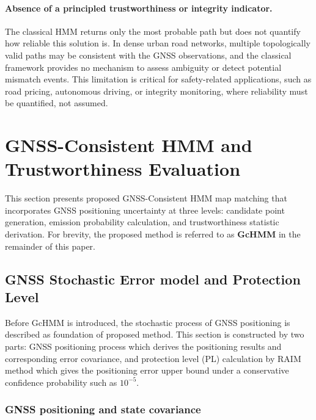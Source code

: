 \documentclass[letterpaper,journal]{IEEEtran}
\begin{document}
\paragraph{Absence of a principled trustworthiness or integrity indicator.}
The classical HMM returns only the most probable path but does not quantify
how reliable this solution is. In dense urban road networks, multiple
topologically valid paths may be consistent with the GNSS observations, and
the classical framework provides no mechanism to assess ambiguity or detect
potential mismatch events. This limitation is critical for safety-related
applications, such as road pricing, autonomous driving, or integrity
monitoring, where reliability must be quantified, not assumed.


\section{GNSS-Consistent HMM and Trustworthiness Evaluation}
\label{sec:proposed}
This section presents proposed GNSS-Consistent HMM map matching that incorporates GNSS positioning 
uncertainty at three levels: candidate point generation, emission probability calculation, and 
trustworthiness statistic derivation. For brevity, the proposed method is referred to as \textbf{GcHMM} in the remainder of this paper.

\subsection{GNSS Stochastic Error model and Protection Level}
\label{subsec:gnss_stochastic}
Before GcHMM is introduced, the stochastic process of GNSS positioning is described as foundation of proposed method. This section is constructed by two parts: GNSS positioning process which derives the positioning results and corresponding error covariance, and protection level (PL) calculation by RAIM method which gives the positioning error upper bound under a conservative confidence probability such as $10^{-5}$.

\subsubsection{GNSS positioning and state covariance}
\end{document}
